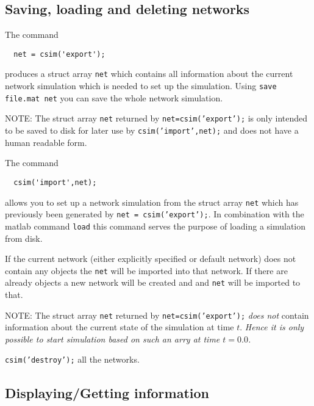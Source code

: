 \subsection{Saving, loading and deleting networks }


The command
\begin{verbatim}
  net = csim('export');
\end{verbatim}
produces a struct array \texttt{net} which contains all information
about the current network simulation which is needed to set up the
simulation. Using \texttt{save file.mat net} you can save the whole
network simulation.

NOTE: The struct array \texttt{net} returned by
\texttt{net=csim('export');} is only intended to be saved to disk for
later use by \texttt{csim('import',net);} and does not have a human
readable form.


The command
\begin{verbatim}
  csim('import',net);
\end{verbatim}
allows you to set up a network simulation from the struct array
\texttt{net} which has previously been generated by \texttt{net =
  csim('export');}. In combination with the matlab command
\texttt{load} this \csim command serves the purpose of loading a
simulation from disk.

If the current network (either explicitly specified or default
network) does not contain any objects the \texttt{net} will be
imported into that network. If there are already objects a new network
will be created and and \texttt{net} will be imported to that.

NOTE: The struct array \texttt{net} returned by
\texttt{net=csim('export');} \emph{does not} contain information about
the current state of the simulation at time $t$.  \emph{Hence it is
  only possible to start simulation based on such an arry at time
  $t=0.0$.}


\texttt{csim('destroy');} all the networks.

\subsection{Displaying/Getting information}


